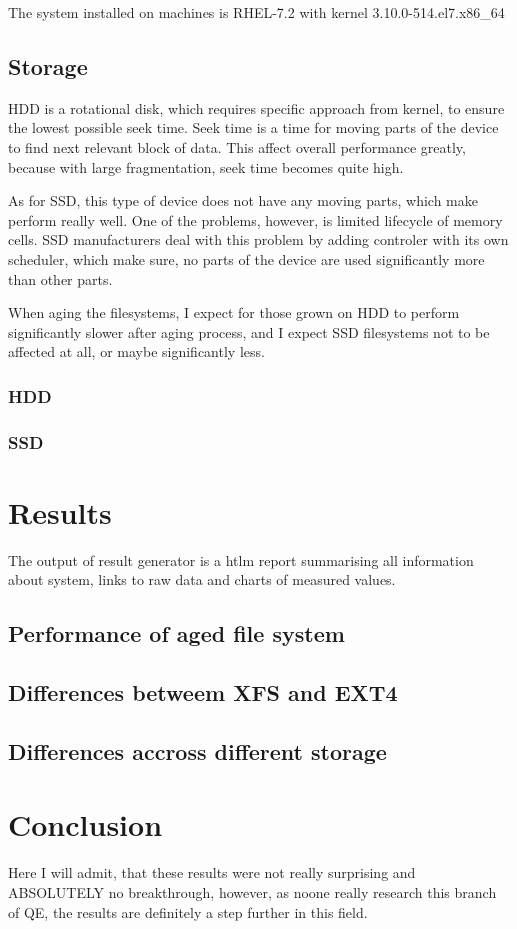 \documentclass[
  color, %
  table, %
  lof,   %
  lot,   %
]{fithesis3}
\begin{document}
The system installed on machines is RHEL-7.2 with kernel 3.10.0-514.el7.x86\_64 


\section{Storage}
HDD is a rotational disk, which requires specific approach from kernel, to ensure the lowest possible seek time. Seek time is a time for moving parts of the device to find next relevant block of data. This affect overall performance greatly, because with large fragmentation, seek time becomes quite high.

As for SSD, this type of device does not have any moving parts, which make perform really well. One of the problems, however, is limited lifecycle of memory cells. SSD manufacturers deal with this problem by adding controler with its own scheduler, which make sure, no parts of the device are used significantly more than other parts.

When aging the filesystems, I expect for those grown on HDD to perform significantly slower after aging process, and I expect SSD filesystems not to be affected at all, or maybe significantly less.

\subsection{HDD}
\subsection{SSD}



\chapter{Results}
The output of result generator is a htlm report summarising all information about system, links to raw data and charts of measured values.

\section{Performance of aged file system}
\section{Differences betweem XFS and EXT4}
\section{Differences accross different storage}
\chapter{Conclusion}
Here I will admit, that these results were not really surprising and ABSOLUTELY no breakthrough, however, as noone really research this branch of QE, the results are definitely a step further in this field.

\printbibliography
\end{document}
